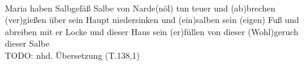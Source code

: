 \begin{exe}
\ex \label{ex:T27561} \gll {}                                      \\
{Maria} {haben} {Salbgefäß} {Salbe} {von} {Narde(nöl)} {tun} {teuer} {} {und} {(ab)brechen} {(ver)gießen} {über} {sein} {Haupt} {niedersinken} {} {und} {(ein)salben} {sein (eigen)} {Fuß} {und} {abreiben} {mit} {er} {Locke} {} {und} {dieser} {Haus} {sein} {(er)füllen} {von} {dieser} {(Wohl)geruch} {dieser} {Salbe} {}\\
\glt TODO: nhd. Übersetzung (T.138,1)
\end{exe}
